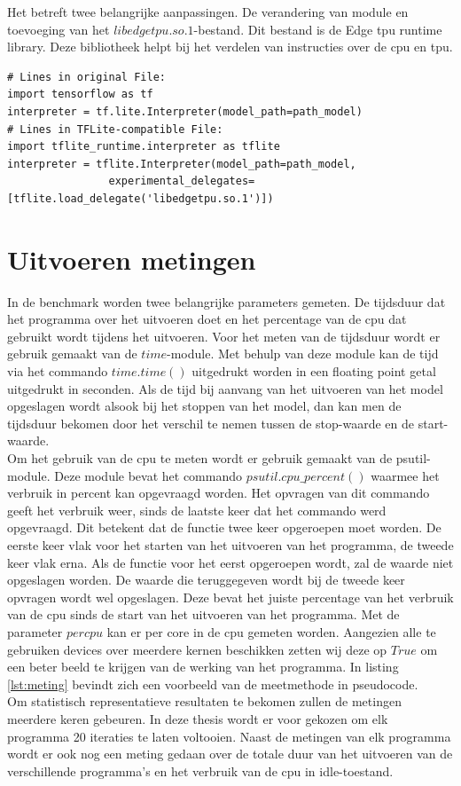		Het betreft twee belangrijke aanpassingen. De verandering van module en toevoeging van het $libedgetpu.so.1$-bestand. Dit bestand is de Edge \gls{tpu} runtime library. Deze bibliotheek helpt bij het verdelen van instructies over de \gls{cpu} en \gls{tpu}. 

	\begin{lstlisting}[caption={Converteren naar een TFLite-programma.}, captionpos=b,label={lst:TFLconversieprogram}]
# Lines in original File:
import tensorflow as tf
interpreter = tf.lite.Interpreter(model_path=path_model)
# Lines in TFLite-compatible File:
import tflite_runtime.interpreter as tflite
interpreter = tflite.Interpreter(model_path=path_model,
				experimental_delegates=[tflite.load_delegate('libedgetpu.so.1')])
	\end{lstlisting}	

		
\section{Uitvoeren metingen}

	In de benchmark worden twee belangrijke parameters gemeten. De tijdsduur dat het programma over het uitvoeren doet en het percentage van de \gls{cpu} dat gebruikt wordt tijdens het uitvoeren. Voor het meten van de tijdsduur wordt er gebruik gemaakt van de $time$-module. Met behulp van deze module kan de tijd via het commando $time.time()$ uitgedrukt worden in een floating point getal uitgedrukt in seconden. Als de tijd bij aanvang van het uitvoeren van het model opgeslagen wordt alsook bij het stoppen van het model, dan kan men de tijdsduur bekomen door het verschil te nemen tussen de stop-waarde en de start-waarde.\\
	Om het gebruik van de \gls{cpu} te meten wordt er gebruik gemaakt van de psutil-module. Deze module bevat het commando $psutil.cpu\_percent()$ waarmee het verbruik in percent kan opgevraagd worden. Het opvragen van dit commando geeft het verbruik weer, sinds de laatste keer dat het commando werd opgevraagd. Dit betekent dat de functie twee keer opgeroepen moet worden. De eerste keer vlak voor het starten van het uitvoeren van het programma, de tweede keer vlak erna. Als de functie voor het eerst opgeroepen wordt, zal de waarde niet opgeslagen worden. De waarde die teruggegeven wordt bij de tweede keer opvragen wordt wel opgeslagen. Deze bevat het juiste percentage van het verbruik van de \gls{cpu} sinds de start van het uitvoeren van het programma. Met de parameter $percpu$ kan er per core in de \gls{cpu} gemeten worden. Aangezien alle te gebruiken devices over meerdere kernen beschikken zetten wij deze op $True$ om een beter beeld te krijgen van de werking van het programma. In listing \ref{lst:meting} bevindt zich een voorbeeld van de meetmethode in pseudocode.\\
	Om statistisch representatieve resultaten te bekomen zullen de metingen meerdere keren gebeuren. In deze thesis wordt er voor gekozen om elk programma 20 iteraties te laten voltooien. Naast de metingen van elk programma wordt er ook nog een meting gedaan over de totale duur van het uitvoeren van de verschillende programma's en het verbruik van de \gls{cpu} in idle-toestand.


